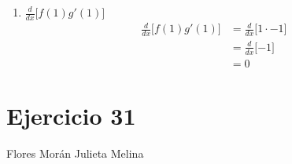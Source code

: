 \documentclass[12pt]{article}
\begin{document}
\begin{enumerate}[label=(\alph*)]
\item $\frac{d}{dx} \lbrack f(1)g'(1) \rbrack$
  \begin{equation*}
    \begin{split}
      \frac{d}{dx} \lbrack f(1)g'(1) \rbrack
      & = \frac{d}{dx} \lbrack 1 \cdot -1 \rbrack \\
      & = \frac{d}{dx} \lbrack -1 \rbrack \\
      & = 0
    \end{split}
  \end{equation*}
  
\end{enumerate}

\section{Ejercicio 31} Flores Morán Julieta Melina\\
\end{document}
